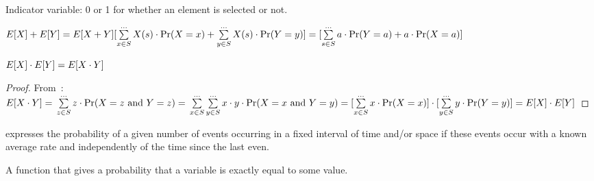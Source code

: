 \begin{definition}
    Indicator variable: 0 or 1 for whether an element is selected or not.
\end{definition}


\begin{definition}\label{lin_expect}
    $ E[X] + E[Y] = E[X + Y] \newline
    [\sum\limits_{x \in S}^{\dots} X(s) \cdot \Pr(X = x) +
    \sum\limits_{y \in S}^{\dots} X(s) \cdot \Pr(Y = y) ] \newline
    = [\sum\limits_{s \in S}^{\dots} a \cdot \Pr(Y = a) + a \cdot \Pr(X = a) ]
    $
\end{definition}

\begin{theorem}
    $ \newline E[X] \cdot E[Y] = E[X \cdot Y]$
\end{theorem}
\begin{proof}
    From~: \newline
    $
    E[X \cdot Y] = \newline \sum\limits_{z \in S}^{\dots} z \cdot 
        \Pr(X = z \text{ and } Y = z) = \newline
    \sum\limits_{x \in S}^{\dots}\sum\limits_{y \in S}^{\dots} x \cdot y
    \cdot \Pr(X = x \text{ and } Y=y) = \newline
    [\sum\limits_{x \in S}^{\dots} x \cdot \Pr(X = x)] \cdot  
    [\sum\limits_{y \in S}^{\dots} y \cdot \Pr(Y = y)]  = \newline
    E[X] \cdot E[Y]
    $
\end{proof}

\begin{definition}
    expresses the probability of a given number of events occurring in a fixed
    interval of time and/or space if these events occur with a known average
    rate and independently of the time since the last even.

\end{definition}

\begin{definition}
    A function that gives a probability that a variable is exactly equal to
    some value.
\end{definition}
